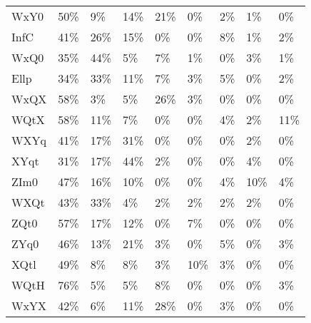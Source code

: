 \begin{table}[htbp!]
\begin{adjustbox}{width=1\textwidth}
\begin{tabular}{lllllllll}
WxY0        &          50\% &         9\% &          14\% &       21\% &            0\% &       2\% &           1\% &            0\% \\
InfC        &          41\% &        26\% &          15\% &        0\% &            0\% &       8\% &           1\% &            2\% \\
WxQ0        &          35\% &        44\% &           5\% &        7\% &            1\% &       0\% &           3\% &            1\% \\
Ellp        &          34\% &        33\% &          11\% &        7\% &            3\% &       5\% &           0\% &            2\% \\
WxQX        &          58\% &         3\% &           5\% &       26\% &            3\% &       0\% &           0\% &            0\% \\
WQtX        &          58\% &        11\% &           7\% &        0\% &            0\% &       4\% &           2\% &           11\% \\
WXYq        &          41\% &        17\% &          31\% &        0\% &            0\% &       0\% &           2\% &            0\% \\
XYqt        &          31\% &        17\% &          44\% &        2\% &            0\% &       0\% &           4\% &            0\% \\
ZIm0        &          47\% &        16\% &          10\% &        0\% &            0\% &       4\% &          10\% &            4\% \\
WXQt        &          43\% &        33\% &           4\% &        2\% &            2\% &       2\% &           2\% &            0\% \\
ZQt0        &          57\% &        17\% &          12\% &        0\% &            7\% &       0\% &           0\% &            0\% \\
ZYq0        &          46\% &        13\% &          21\% &        3\% &            0\% &       5\% &           0\% &            3\% \\
XQtl        &          49\% &         8\% &           8\% &        3\% &           10\% &       3\% &           0\% &            0\% \\
WQtH        &          76\% &         5\% &           5\% &        8\% &            0\% &       0\% &           0\% &            3\% \\
WxYX        &          42\% &         6\% &          11\% &       28\% &            0\% &       3\% &           0\% &            0\% \\

\end{tabular}
\end{adjustbox}
\end{table}
